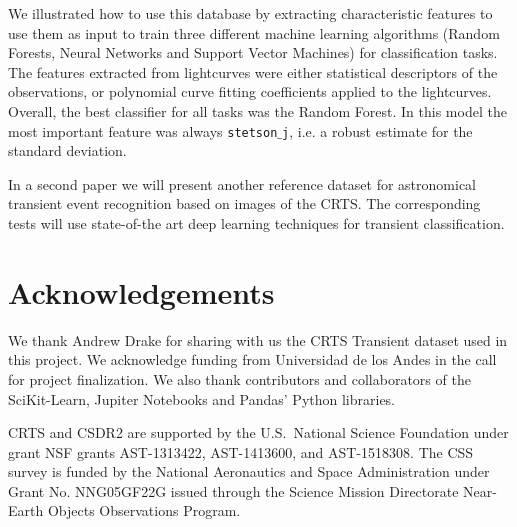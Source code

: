 \documentclass[twocolumn]{aastex62}
\begin{document}
We illustrated how to use this database by extracting 
characteristic features to use them as input to train three different
machine learning algorithms (Random Forests, Neural Networks and
Support Vector Machines) for classification tasks.
The features extracted from lightcurves were either statistical
descriptors of the observations, or polynomial curve fitting
coefficients applied to the lightcurves.   
Overall, the best classifier for all tasks was the Random Forest.
In this model the most important feature was always
\texttt{stetson$\_$j}, i.e. a robust estimate for the standard
deviation. 

In a second paper we will present another reference dataset for
astronomical transient event recognition based on images of the
CRTS.
The corresponding tests will use  state-of-the art deep learning
techniques for transient classification. 

\section*{Acknowledgements}

We thank Andrew Drake for sharing with us the CRTS Transient dataset
used in this project.  
We acknowledge funding from Universidad de los Andes in the call for
project finalization.
We also thank contributors and collaborators of the SciKit-Learn,
Jupiter Notebooks and Pandas' Python libraries.  

CRTS and CSDR2 are supported by the U.S.~National Science 
Foundation under grant NSF grants AST-1313422, AST-1413600, and 
AST-1518308.  The CSS survey is funded by the National Aeronautics
and Space Administration under Grant No. NNG05GF22G issued through
the Science Mission Directorate Near-Earth Objects Observations Program.



\end{document}
